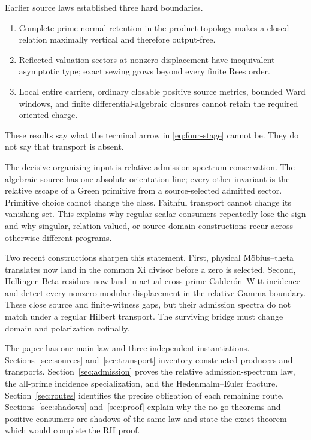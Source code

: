 \documentclass[11pt]{article}
\theoremstyle{definition}
\theoremstyle{remark}
\begin{document}
Earlier source laws established three hard boundaries.
\begin{enumerate}[label=\textup{(\roman*)},leftmargin=2.2em]
\item Complete prime-normal retention in the product topology makes a
      closed relation maximally vertical and therefore output-free.
\item Reflected valuation sectors at nonzero displacement have
      inequivalent asymptotic type; exact sewing grows beyond every finite
      Rees order.
\item Local entire carriers, ordinary closable positive source metrics,
      bounded Ward windows, and finite differential-algebraic closures
      cannot retain the required oriented charge.
\end{enumerate}
These results say what the terminal arrow in \eqref{eq:four-stage} cannot
be.  They do not say that transport is absent.

The decisive organizing input is relative admission-spectrum
conservation.  The algebraic source has one absolute orientation line;
every other invariant is the relative escape of a Green primitive from a
source-selected admitted sector.  Primitive choice cannot change the
class.  Faithful transport cannot change its vanishing set.  This explains
why regular scalar consumers repeatedly lose the sign and why singular,
relation-valued, or source-domain constructions recur across otherwise
different programs.

Two recent constructions sharpen this statement.  First, physical
M\"obius--theta translates now land in the common Xi divisor before a zero
is selected.  Second, Hellinger--Beta residues now land in actual
cross-prime Calder\'on--Witt incidence and detect every nonzero modular
displacement in the relative Gamma boundary.  These close source and
finite-witness gaps, but their admission spectra do not match under a
regular Hilbert transport.  The surviving bridge must change domain and
polarization cofinally.

The paper has one main law and three independent instantiations.
Sections~\ref{sec:sources} and~\ref{sec:transport} inventory constructed
producers and transports.  Section~\ref{sec:admission} proves the relative
admission-spectrum law, the all-prime incidence specialization, and the
Hedenmalm--Euler fracture.
Section~\ref{sec:routes} identifies the precise obligation of each
remaining route.  Sections~\ref{sec:shadows} and~\ref{sec:proof} explain
why the no-go theorems and positive consumers are shadows of the
same law and state the exact theorem which would complete the RH proof.
\end{document}
